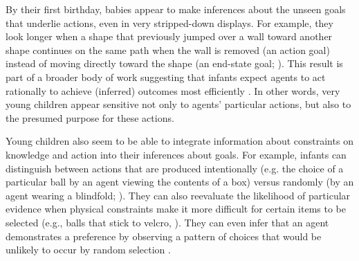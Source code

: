 \documentclass[man]{apa2}
\begin{document}


By their first birthday, babies appear to make inferences about the unseen goals that underlie actions, even in very stripped-down displays.  For example, they look longer when a shape that previously jumped over a wall toward another shape continues on the same path when the wall is removed (an action goal) instead of moving directly toward the shape (an end-state goal; ). This result is part of a broader body of work suggesting that infants expect agents to act rationally to achieve (inferred) outcomes most efficiently \cite{csibra1998, gergely2003}. In other words, very young children appear sensitive not only to agents' particular actions, but also to the presumed purpose for these actions. 

Young children also seem to be able to integrate information about constraints on knowledge and action into their inferences about goals. For example, infants can distinguish between actions that are produced intentionally (e.g. the choice of a particular ball by an agent viewing the contents of a box) versus randomly (by an agent wearing a blindfold; ).  They can also reevaluate the likelihood of particular evidence when physical constraints make it more difficult for certain items to be selected (e.g., balls that stick to velcro, ).  They can even infer that an agent demonstrates a preference by observing a pattern of choices that would be unlikely to occur by random selection \cite{kushnir2010}. 
\end{document}
